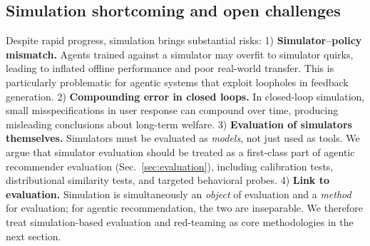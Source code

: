 \subsection{Simulation shortcoming and open challenges}
Despite rapid progress, simulation brings substantial risks: 
1) \textbf{Simulator--policy mismatch.}
Agents trained against a simulator may overfit to simulator quirks, leading to inflated offline performance and poor real-world transfer. This is particularly problematic for agentic systems that exploit loopholes in feedback generation. 
2) \textbf{Compounding error in closed loops.}
In closed-loop simulation, small misspecifications in user response can compound over time, producing misleading conclusions about long-term welfare. 
3) \textbf{Evaluation of simulators themselves.}
Simulators must be evaluated as \emph{models}, not just used as tools. We argue that simulator evaluation should be treated as a first-class part of agentic recommender evaluation (Sec.~\ref{sec:evaluation}), including calibration tests, distributional similarity tests, and targeted behavioral probes. 
4) \textbf{Link to evaluation.}
Simulation is simultaneously an \emph{object} of evaluation and a \emph{method} for evaluation; for agentic recommendation, the two are inseparable. We therefore treat simulation-based evaluation and red-teaming as core methodologies in the next section.








